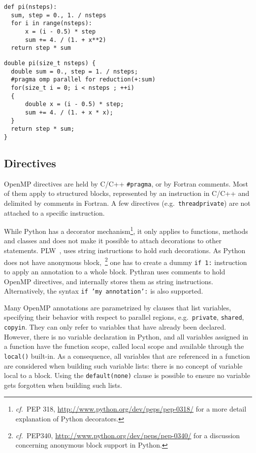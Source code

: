 \documentclass[conference]{IEEEtran}
\newcommand\see{\emph{cf.\ }}
\begin{document}
\begin{lstlisting}[float, label={lst:motivating-example}, caption={Motivating
example: computing $\pi$ in Python.}]
def pi(nsteps):
  sum, step = 0., 1. / nsteps
  for i in range(nsteps):
      x = (i - 0.5) * step
      sum += 4. / (1. + x**2)
  return step * sum
\end{lstlisting}

\begin{lstlisting}[float, label={lst:motivating-example-c}, caption={Motivating
example: computing $\pi$ in C with OpenMP.}]
double pi(size_t nsteps) {
  double sum = 0., step = 1. / nsteps;
  #pragma omp parallel for reduction(+:sum)
  for(size_t i = 0; i < nsteps ; ++i)
  {
      double x = (i - 0.5) * step;
      sum += 4. / (1. + x * x);
  }
  return step * sum;
}
\end{lstlisting}


\subsection{Directives}

OpenMP directives are held by C/C++ \texttt{\#pragma}, or by Fortran comments. Most of them
apply to structured blocks, represented by an instruction in C/C++ and delimited
by comments in Fortran. A few directives (e.g.\ \texttt{threadprivate}) are not
attached to a specific instruction.

While Python has a decorator mechanism\footnote{\see PEP 318,
\url{http://www.python.org/dev/peps/pep-0318/} for a more detail explanation of
Python decorators.}, it only applies to functions, methods and classes and does
not make it possible to attach decorations to other statements.
PLW~\cite{dongara2007}, uses string instructions to hold such decorations. As
Python does not have anonymous block,~\footnote{\see PEP340,
    \url{http://www.python.org/dev/peps/pep-0340/} for a discussion concerning
anonymous block support in Python.} one has to create a dummy \texttt{if 1:}
instruction to apply an annotation to a whole block. Pythran uses comments to
hold OpenMP directives, and internally stores them as string instructions.
Alternatively, the syntax \texttt{if 'my annotation':} is also supported. 

Many OpenMP annotations are parametrized by clauses that list variables,
specifying their behavior with respect to parallel regions, e.g.\
\texttt{private}, \texttt{shared}, \texttt{copyin}. They can only refer to
variables that have already been declared. However, there is no variable
declaration in Python, and all variables assigned in a function have the
function scope, called local scope and available through the \texttt{local()}
built-in. As a consequence, all variables that are referenced in a function are
considered when building such variable lists: there is no concept of variable
local to a block. Using the \texttt{default(none)} clause is possible to ensure
no variable gets forgotten when building such lists.
\end{document}
